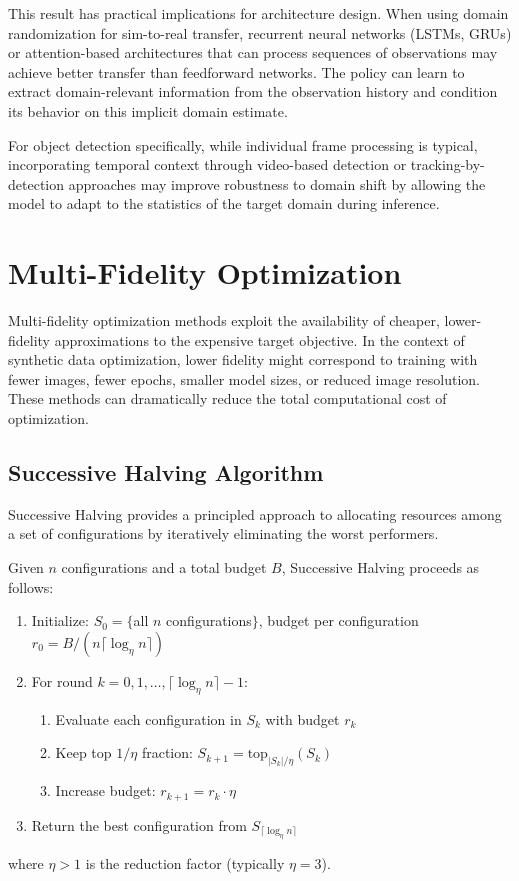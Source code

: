 This result has practical implications for architecture design. When using domain randomization for sim-to-real transfer, recurrent neural networks (LSTMs, GRUs) or attention-based architectures that can process sequences of observations may achieve better transfer than feedforward networks. The policy can learn to extract domain-relevant information from the observation history and condition its behavior on this implicit domain estimate.

For object detection specifically, while individual frame processing is typical, incorporating temporal context through video-based detection or tracking-by-detection approaches may improve robustness to domain shift by allowing the model to adapt to the statistics of the target domain during inference.

\section{Multi-Fidelity Optimization}
\label{sec:multi_fidelity}

Multi-fidelity optimization methods exploit the availability of cheaper, lower-fidelity approximations to the expensive target objective. In the context of synthetic data optimization, lower fidelity might correspond to training with fewer images, fewer epochs, smaller model sizes, or reduced image resolution. These methods can dramatically reduce the total computational cost of optimization.

\subsection{Successive Halving Algorithm}
\label{subsec:successive_halving}

Successive Halving provides a principled approach to allocating resources among a set of configurations by iteratively eliminating the worst performers.

\begin{definition}
\label{def:successive_halving}
Given $n$ configurations and a total budget $B$, Successive Halving proceeds as follows:
\begin{enumerate}
\item Initialize: $S_0 = \{$all $n$ configurations$\}$, budget per configuration $r_0 = B/(n \lceil \log_\eta n \rceil)$
\item For round $k = 0, 1, \ldots, \lceil \log_\eta n \rceil - 1$:
    \begin{enumerate}
    \item Evaluate each configuration in $S_k$ with budget $r_k$
    \item Keep top $1/\eta$ fraction: $S_{k+1} = \text{top}_{|S_k|/\eta}(S_k)$
    \item Increase budget: $r_{k+1} = r_k \cdot \eta$
    \end{enumerate}
\item Return the best configuration from $S_{\lceil \log_\eta n \rceil}$
\end{enumerate}
where $\eta > 1$ is the reduction factor (typically $\eta = 3$).
\end{definition}

